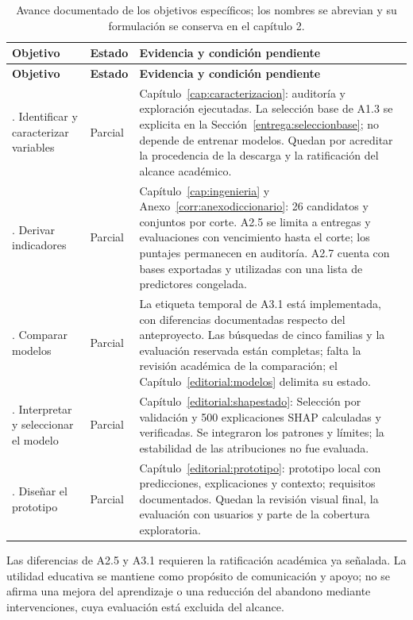 \begingroup\small\setlength{\tabcolsep}{4pt}\renewcommand{\arraystretch}{1.18}
\begin{longtable}{>{\raggedright\arraybackslash}p{.21\linewidth}>{\raggedright\arraybackslash}p{.13\linewidth}>{\raggedright\arraybackslash}p{.59\linewidth}}
\caption[Avance documentado de los objetivos específicos.]{Avance documentado de los objetivos específicos; los nombres se abrevian y su formulación se conserva en el capítulo 2.}\label{editorial:avance}\\
\toprule\textbf{Objetivo} & \textbf{Estado} & \textbf{Evidencia y condición pendiente}\\\midrule\endfirsthead
\toprule\textbf{Objetivo} & \textbf{Estado} & \textbf{Evidencia y condición pendiente}\\\midrule\endhead
\bottomrule\endfoot
1. Identificar y caracterizar variables & Parcial & Capítulo~\ref{cap:caracterizacion}: auditoría y exploración ejecutadas. La selección base de A1.3 se explicita en la Sección~\ref{entrega:seleccionbase}; no depende de entrenar modelos. Quedan por acreditar la procedencia de la descarga y la ratificación del alcance académico.\\
2. Derivar indicadores & Parcial & Capítulo~\ref{cap:ingenieria} y Anexo~\ref{corr:anexodiccionario}: 26 candidatos y conjuntos por corte. A2.5 se limita a entregas y evaluaciones con vencimiento hasta el corte; los puntajes permanecen en auditoría. A2.7 cuenta con bases exportadas y utilizadas con una lista de predictores congelada.\\
3. Comparar modelos & Parcial & La etiqueta temporal de A3.1 está implementada, con diferencias documentadas respecto del anteproyecto. Las búsquedas de cinco familias y la evaluación reservada están completas; falta la revisión académica de la comparación; el Capítulo~\ref{editorial:modelos} delimita su estado.\\
4. Interpretar y seleccionar el modelo & Parcial & Capítulo~\ref{editorial:shapestado}: Selección por validación y 500 explicaciones SHAP calculadas y verificadas. Se integraron los patrones y límites; la estabilidad de las atribuciones no fue evaluada.\\
5. Diseñar el prototipo & Parcial & Capítulo~\ref{editorial:prototipo}: prototipo local con predicciones, explicaciones y contexto; requisitos documentados. Quedan la revisión visual final, la evaluación con usuarios y parte de la cobertura exploratoria.\\
\end{longtable}\endgroup
Las diferencias de A2.5 y A3.1 requieren la ratificación académica ya señalada. La utilidad educativa se mantiene como propósito de comunicación y apoyo; no se afirma una mejora del aprendizaje o una reducción del abandono mediante intervenciones, cuya evaluación está excluida del alcance.
